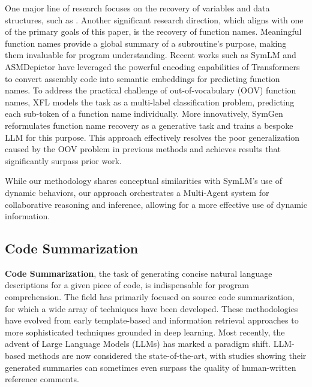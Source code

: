 \documentclass[acmsmall,screen,review,anonymous]{acmart} %
\begin{document}
One major line of research focuses on the recovery of variables and data structures, such as \cite{TypeFSL, ReSym, HyRES, ReSym}. Another significant research direction, which aligns with one of the primary goals of this paper, is the recovery of function names. Meaningful function names provide a global summary of a subroutine's purpose, making them invaluable for program understanding. Recent works such as SymLM\cite{SymLM} and ASMDepictor\cite{AsmDepictor} have leveraged the powerful encoding capabilities of Transformers to convert assembly code into semantic embeddings for predicting function names. To address the practical challenge of out-of-vocabulary (OOV) function names, XFL\cite{XFL} models the task as a multi-label classification problem, predicting each sub-token of a function name individually. More innovatively, SymGen\cite{SymGen} reformulates function name recovery as a generative task and trains a bespoke LLM for this purpose. This approach effectively resolves the poor generalization caused by the OOV problem in previous methods and achieves results that significantly surpass prior work.

While our methodology shares conceptual similarities with SymLM's use of dynamic behaviors, our approach orchestrates a Multi-Agent system for collaborative reasoning and inference, allowing for a more effective use of dynamic information.

\subsection{Code Summarization}
\textbf{Code Summarization}, the task of generating concise natural language descriptions for a given piece of code, is indispensable for program comprehension. The field has primarily focused on source code summarization\cite{LLM_cs, multi_intent_LLM, scs_via_LLM, cs_beyond_function, structured_cs_hyctx, statement_cs_LLM}, for which a wide array of techniques have been developed. These methodologies have evolved from early template-based\cite{abid_using_2015, ad-wood-2003} and information retrieval\cite{Eye_Tracking, AutoComment} approaches to more sophisticated techniques grounded in deep learning\cite{deep_cs, DeepCommenter, AST-trans, Alternative_cs, developer_intent_cs}. Most recently, the advent of Large Language Models (LLMs) has marked a paradigm shift. LLM-based methods are now considered the state-of-the-art, with studies showing their generated summaries can sometimes even surpass the quality of human-written reference comments\cite{LLM_cs, cs_chatgpt}.
\end{document}
